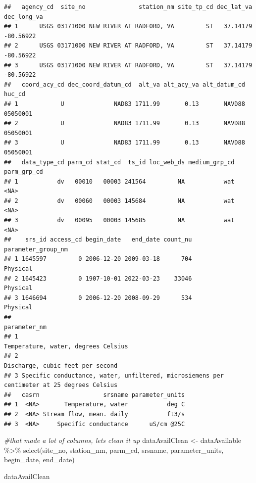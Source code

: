 \documentclass[
]{book}
\newenvironment{Shaded}{\begin{snugshade}}{\end{snugshade}}
\newcommand{\CommentTok}[1]{\textcolor[rgb]{0.56,0.35,0.01}{\textit{#1}}}
\newcommand{\FunctionTok}[1]{\textcolor[rgb]{0.00,0.00,0.00}{#1}}
\newcommand{\NormalTok}[1]{#1}
\newcommand{\OtherTok}[1]{\textcolor[rgb]{0.56,0.35,0.01}{#1}}
\newcommand{\SpecialCharTok}[1]{\textcolor[rgb]{0.00,0.00,0.00}{#1}}
\begin{document}
\begin{verbatim}
##   agency_cd  site_no               station_nm site_tp_cd dec_lat_va dec_long_va
## 1      USGS 03171000 NEW RIVER AT RADFORD, VA         ST   37.14179   -80.56922
## 2      USGS 03171000 NEW RIVER AT RADFORD, VA         ST   37.14179   -80.56922
## 3      USGS 03171000 NEW RIVER AT RADFORD, VA         ST   37.14179   -80.56922
##   coord_acy_cd dec_coord_datum_cd  alt_va alt_acy_va alt_datum_cd   huc_cd
## 1            U              NAD83 1711.99       0.13       NAVD88 05050001
## 2            U              NAD83 1711.99       0.13       NAVD88 05050001
## 3            U              NAD83 1711.99       0.13       NAVD88 05050001
##   data_type_cd parm_cd stat_cd  ts_id loc_web_ds medium_grp_cd parm_grp_cd
## 1           dv   00010   00003 241564         NA           wat        <NA>
## 2           dv   00060   00003 145684         NA           wat        <NA>
## 3           dv   00095   00003 145685         NA           wat        <NA>
##    srs_id access_cd begin_date   end_date count_nu parameter_group_nm
## 1 1645597         0 2006-12-20 2009-03-18      704           Physical
## 2 1645423         0 1907-10-01 2022-03-23    33046           Physical
## 3 1646694         0 2006-12-20 2008-09-29      534           Physical
##                                                                                 parameter_nm
## 1                                                        Temperature, water, degrees Celsius
## 2                                                           Discharge, cubic feet per second
## 3 Specific conductance, water, unfiltered, microsiemens per centimeter at 25 degrees Celsius
##   casrn                  srsname parameter_units
## 1  <NA>       Temperature, water           deg C
## 2  <NA> Stream flow, mean. daily           ft3/s
## 3  <NA>     Specific conductance      uS/cm @25C
\end{verbatim}

\begin{Shaded}
\begin{Highlighting}[]
\CommentTok{\#that made a lot of columns, let\textquotesingle{}s clean it up}
\NormalTok{dataAvailClean }\OtherTok{\textless{}{-}}\NormalTok{ dataAvailable }\SpecialCharTok{\%\textgreater{}\%} \FunctionTok{select}\NormalTok{(site\_no, }
\NormalTok{                                           station\_nm,}
\NormalTok{                                           parm\_cd, }
\NormalTok{                                           srsname, }
\NormalTok{                                           parameter\_units,}
\NormalTok{                                           begin\_date, }
\NormalTok{                                           end\_date)}

\NormalTok{dataAvailClean}
\end{Highlighting}
\end{Shaded}
\end{document}
